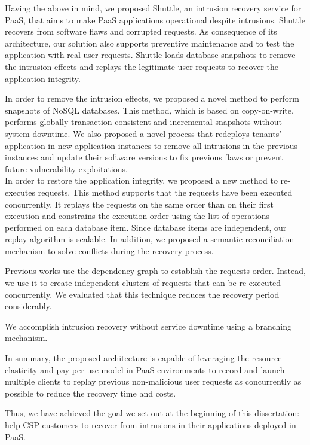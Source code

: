 Having the above in mind, we proposed Shuttle, an intrusion recovery service for \ac{PaaS}, that aims to make \ac{PaaS} applications operational despite intrusions. Shuttle recovers from software flaws and corrupted requests. As consequence of its architecture, our solution also supports preventive maintenance and to test the application with real user requests. Shuttle loads database snapshots to remove the intrusion effects and replays the legitimate user requests to recover the application integrity.

In order to remove the intrusion effects, we proposed a novel method to perform snapshots of \acs{NoSQL} databases. This method, which is based on copy-on-write, performs globally transaction-consistent and incremental snapshots without system downtime. We also proposed a novel process that redeploys tenants' application in new application instances to remove all intrusions in the previous instances and update their software versions to fix previous flaws or prevent future vulnerability exploitations.\\

In order to restore the application integrity, we proposed a new method to re-executes requests. This method supports that the requests have been executed concurrently. It replays the requests on the same order than on their first execution and constrains the execution order using the list of operations performed on each database item. Since database items are independent, our replay algorithm is scalable. In addition, we proposed a semantic-reconciliation mechanism to solve conflicts during the recovery process.

Previous works use the dependency graph to establish the requests order. Instead, we use it to create independent clusters of requests that can be re-executed concurrently. We evaluated that this technique reduces the recovery period considerably.

We accomplish intrusion recovery without service downtime using a branching mechanism.

In summary, the proposed architecture is capable of leveraging the resource elasticity and pay-per-use model in \ac{PaaS} environments to record and launch multiple clients to replay previous non-malicious user requests as concurrently as possible to reduce the recovery time and costs.

Thus, we have achieved the goal we set out at the beginning of this dissertation: help \acf{CSP} customers to recover from intrusions in their applications deployed in \acf{PaaS}.

